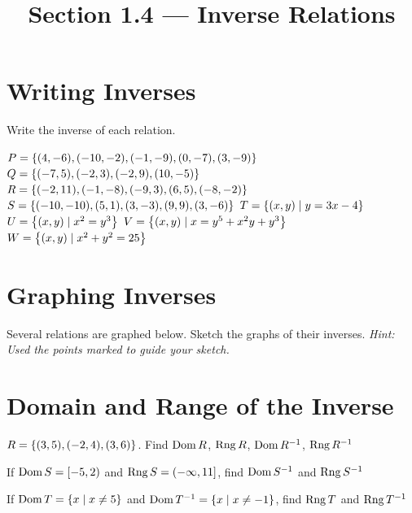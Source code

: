 

\title{Section 1.4 --- Inverse Relations}


\maketitle

\section*{Writing Inverses}
Write the inverse of each relation.
\begin{smenum}
\mitemx
{$P=\left\{(4,-6),(-10,-2),(-1,-9),(0,-7),(3,-9)\right\}$}
\mitemx
{$Q=\left\{(-7,5),(-2,3),(-2,9),(10,-5)\right\}$}
\mitemx
{$R=\left\{(-2,11),(-1,-8),(-9,3),(6,5),(-8,-2)\right\}$}
\mitemx
{$S=\left\{(-10,-10),(5,1),(3,-3),(9,9),(3,-6)\right\}$}
\mitemxx
{$T=\left\{(x,y)\mid y=3x-4\right\}$}
{$U=\left\{(x,y)\mid x^2=y^3\right\}$}
\mitemxx
{$V=\left\{(x,y)\mid x=y^5+x^2y+y^3\right\}$}
{$W=\left\{(x,y)\mid x^2+y^2=25\right\}$}
\end{smenum}

\section*{Graphing Inverses}
Several relations are graphed below.  Sketch the graphs of their inverses.  \emph{Hint: Used the points marked to guide your sketch.}
\begin{smenum}
\mitemxx
{\LittleGraphEO[.15in]{
    \draw[thick,domain=-4:4,smooth] plot (1/3*\x*\x*\x-4/3*\x,-2*\x);
		\foreach \x in {-2.5,-2,-1,0,1,2,2.5}
		    \fill (1/3*\x*\x*\x-4/3*\x,-2*\x) circle (.2);
}}
{}
\mitemxx
{}
{}
\end{smenum}
\section*{Domain and Range of the Inverse}
\begin{senum}
\item $R=\left\{(3,5),(-2,4),(3,6)\right\}$.  Find $\operatorname{Dom} R$, $\operatorname{Rng} R$, $\operatorname{Dom} R^{-1}$, $\operatorname{Rng} R^{-1}$
\item If $\operatorname{Dom} S=\left[-5,2\right)$ and $\operatorname{Rng} S=\left(-\infty,11\right]$, find $\operatorname{Dom} S^{-1}$ and $\operatorname{Rng} S^{-1}$
\item If $\operatorname{Dom} T=\left\{x\mid x\neq 5\right\}$ and $\operatorname{Dom} T^{-1}=\left\{x\mid x\neq -1\right\}$, find $\operatorname{Rng} T$ and $\operatorname{Rng} T^{-1}$
\end{senum}

